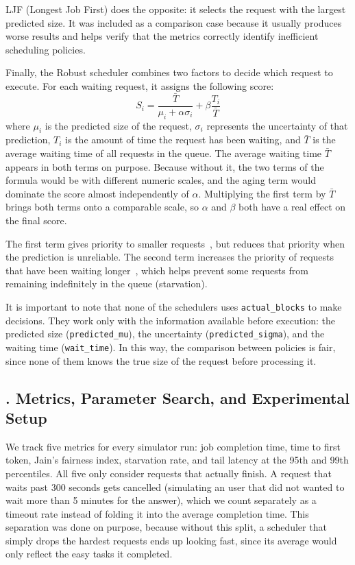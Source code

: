 LJF (Longest Job First) does the opposite: it selects the request with the largest predicted size. It was included as a comparison case because it usually produces worse results and helps verify that the metrics correctly identify inefficient scheduling policies.

Finally, the Robust scheduler combines two factors to decide which request to execute. For each waiting request, it assigns the following score:
\[
S_i = \frac{\bar{T}}{\mu_i + \alpha \sigma_i} + \beta \frac{T_i}{\bar{T}}
\]
where $\mu_i$ is the predicted size of the request, $\sigma_i$ represents the uncertainty of that prediction, $T_i$ is the amount of time the request has been waiting, and $\bar{T}$ is the average waiting time of all requests in the queue. The average waiting time $\bar{T}$ appears in both terms on purpose. Because without it, the two terms of the formula would be with different numeric scales, and the aging term would dominate the score almost independently of $\alpha$. Multiplying the first term by $\bar{T}$ brings both terms onto a comparable scale, so $\alpha$ and $\beta$ both have a real effect on the final score.

The first term gives priority to smaller requests~\cite{kwon2023pagedattention, park2024prefix}, but reduces that priority when the prediction is unreliable. The second term increases the priority of requests that have been waiting longer~\cite{hansen1973os}, which helps prevent some requests from remaining indefinitely in the queue (starvation).

It is important to note that none of the schedulers uses \texttt{actual\_blocks} to make decisions. They work only with the information available before execution: the predicted size (\texttt{predicted\_mu}), the uncertainty (\texttt{predicted\_sigma}), and the waiting time (\texttt{wait\_time}). In this way, the comparison between policies is fair, since none of them knows the true size of the request before processing it.

\subsection{. Metrics, Parameter Search, and Experimental Setup}

We track five metrics for every simulator run: job completion time, time to first token, Jain's fairness index, starvation rate, and tail latency at the 95th and 99th percentiles. All five only consider requests that actually finish. A request that waits past 300 seconds gets cancelled (simulating an user that did not wanted to wait more than 5 minutes for the answer), which we count separately as a timeout rate instead of folding it into the average completion time. This separation was done on purpose, because without this split, a scheduler that simply drops the hardest requests ends up looking fast, since its average would only reflect the easy tasks it completed.

